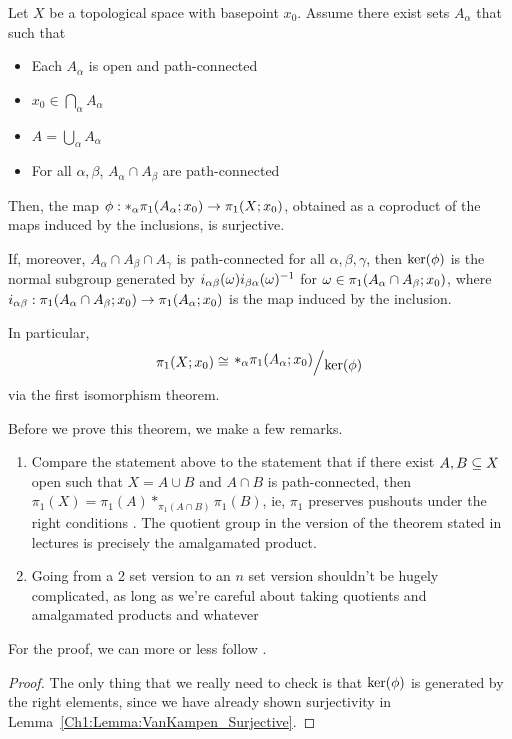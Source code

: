 \begin{boxtheorem}
    Let $X$ be a topological space with basepoint $x_0$. Assume there exist sets $A_{\alpha}$ that such that
    \begin{itemize}
        \item Each $A_{\alpha}$ is open and path-connected
        \item $x_0 \in \bigcap_{\alpha} A_{\alpha}$
        \item $A = \bigcup_{\alpha} A_{\alpha}$
        \item For all $\alpha, \beta$, $A_{\alpha} \cap A_{\beta}$ are path-connected
    \end{itemize}
    Then, the map $\phi : \ast_{\alpha} \pi_1\!\left( A_{\alpha}; x_0 \right) \to \pi_1\!\left( X; x_0 \right)$, obtained as a coproduct of the maps induced by the inclusions, is surjective. \newline

    If, moreover, $A_{\alpha} \cap A_{\beta} \cap A_{\gamma}$ is path-connected for all $\alpha, \beta, \gamma$, then $\operatorname{ker}\!\left( \phi \right)$ is the normal subgroup generated by $i_{\alpha \beta}(\omega) i_{\beta\alpha}(\omega)^{-1}$ for $\omega \in \pi_1\!\left( A_{\alpha} \cap A_{\beta}; x_0 \right)$, where $i_{\alpha \beta} : \pi_1\!\left( A_{\alpha} \cap A_{\beta}; x_0 \right) \to \pi_1\!\left( A_{\alpha}; x_0 \right)$ is the map induced by the inclusion. \newline

    In particular,
    \begin{align*}
        \pi_1\of{X; x_0} \cong \quotient{\ast_{\alpha} \pi_1\of{A_{\alpha}; x_0}}{\pker{\phi}}
    \end{align*}
    via the first isomorphism theorem.
\end{boxtheorem}
\begin{remark}
    Before we prove this theorem, we make a few remarks.
    \begin{enumerate}
        \item Compare the statement above to the statement that if there exist $A, B \subseteq X$ open such that $X = A \cup B$ and $A \cap B$ is path-connected, then $\pi_1(X) = \pi_1(A) *_{\pi_1(A \cap B)} \pi_1(B)$, ie, $\pi_1$ preserves pushouts under the right conditions \cite[Ch 5, Thm 1.2]{EPFLTopologie}. The quotient group in the version of the theorem stated in lectures is precisely the amalgamated product.

        \item Going from a 2 set version to an $n$ set version shouldn't be hugely complicated, as long as we're careful about taking quotients and amalgamated products and whatever
    \end{enumerate}
\end{remark}
For the proof, we can more or less follow \cite[Ch 5, Thm 1.2]{EPFLTopologie}.
\begin{proof}
    The only thing that we really need to check is that $\operatorname{ker}\!\left( \phi \right)$ is generated by the right elements, since we have already shown surjectivity in Lemma~\ref{Ch1:Lemma:VanKampen_Surjective}. \sorry
\end{proof}

